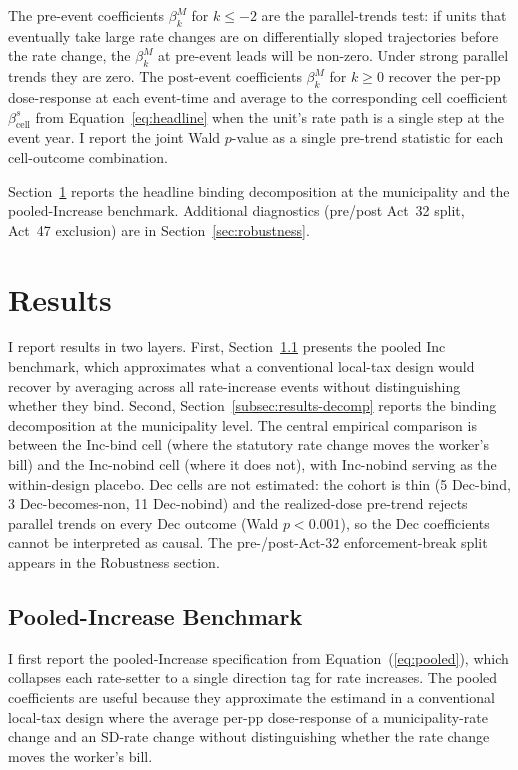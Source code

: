 \documentclass[12pt]{article}
\begin{document}
The pre-event coefficients $\beta^M_k$ for $k \leq -2$ are the
parallel-trends test: if units that eventually take large rate
changes are on differentially sloped trajectories before the rate
change, the $\beta^M_k$ at pre-event leads will be non-zero. Under
strong parallel trends they are zero. The post-event coefficients
$\beta^M_k$ for $k \geq 0$ recover the per-pp dose-response at
each event-time and average to the corresponding cell coefficient
$\beta^s_{\text{cell}}$ from Equation~\ref{eq:headline} when the
unit's rate path is a single step at the event year. I report the
joint Wald $p$-value as a single pre-trend
statistic for each cell-outcome combination.

Section~\ref{sec:results} reports the headline binding
decomposition at the municipality and the pooled-Increase
benchmark. Additional diagnostics (pre/post Act~32 split, Act~47
exclusion) are in Section~\ref{sec:robustness}.

\section{Results}
\label{sec:results}

I report results in two layers. First,
Section~\ref{subsec:results-pooled} presents the pooled Inc
benchmark, which approximates what a conventional local-tax design
would recover by averaging across all rate-increase events without
distinguishing whether they bind. Second,
Section~\ref{subsec:results-decomp} reports the binding
decomposition at the municipality level. The central empirical
comparison is between the Inc-bind cell (where the statutory rate
change moves the worker's bill) and the Inc-nobind cell (where it
does not), with Inc-nobind serving as the within-design placebo.
Dec cells are not estimated: the cohort is thin
(5 Dec-bind, 3 Dec-becomes-non, 11 Dec-nobind) and the
realized-dose pre-trend rejects parallel trends on every Dec
outcome (Wald $p<0.001$), so the Dec coefficients cannot be
interpreted as causal. The pre-/post-Act-32 enforcement-break split
appears in the Robustness section.

\subsection{Pooled-Increase Benchmark}
\label{subsec:results-pooled}

I first report the pooled-Increase specification from
Equation~(\ref{eq:pooled}), which collapses each rate-setter to a
single direction tag for rate increases. The pooled coefficients
are useful because they approximate the estimand in a conventional
local-tax design where the average per-pp dose-response of a
municipality-rate change and an SD-rate change without
distinguishing whether the rate change moves the worker's bill.
\end{document}
